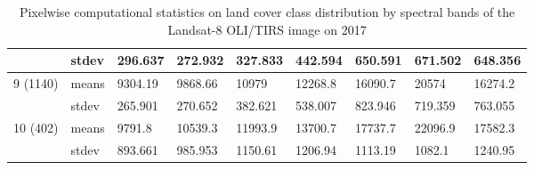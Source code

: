 \documentclass[jmse,article,submit,pdftex,moreauthors]{Definitions/mdpi}
\begin{document}
\begin{table}[H]
\begin{tabularx}{\linewidth}{p{1.3cm}p{1.0cm}p{1.0cm}p{1.0cm}p{1.0cm}p{1.0cm}p{1.0cm}p{1.0cm}p{1.0cm}}
    & stdev & 296.637 & 272.932 & 327.833 & 442.594 & 650.591 & 671.502 & 648.356 \\
    \midrule
    \multirow{2}{*}{9 (1140)} & means & 9304.19 & 9868.66 & 10979 & 12268.8 & 16090.7 & 20574 & 16274.2 \\
    & stdev & 265.901 & 270.652 & 382.621 & 538.007 & 823.946 & 719.359 & 763.055 \\
    \midrule
    \multirow{2}{*}{10 (402)} & means & 9791.8 & 10539.3 & 11993.9 & 13700.7 & 17737.7 & 22096.9 & 17582.3 \\
    & stdev & 893.661 & 985.953 & 1150.61 & 1206.94 & 1113.19 & 1082.1 &1240.95 \\
    \midrule 
\bottomrule
\end{tabularx}
  \caption{Pixelwise computational statistics on land cover class distribution by spectral bands of the Landsat-8 OLI/TIRS image on 2017}
  \label{tab05}
\end{table}
\end{document}
